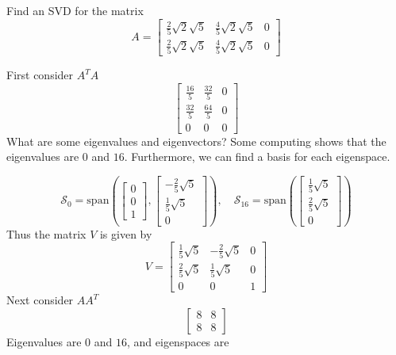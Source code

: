 \documentclass{ximera}
\begin{document}
\begin{example}\label{SVDanother2x3}
Find an SVD for the matrix
\begin{equation*}
A= \left[
\begin{array}{ccc}
\frac{2}{5}\sqrt{2}\sqrt{5} & \frac{4}{5}\sqrt{2}\sqrt{5} & 0 \\
\frac{2}{5}\sqrt{2}\sqrt{5} & \frac{4}{5}\sqrt{2}\sqrt{5} & 0
\end{array}
\right]
\end{equation*}
 
\begin{explanation}
First consider $A^TA$
\begin{equation*}
\left[
\begin{array}{ccc}
\frac{16}{5} & \frac{32}{5} & 0 \\
\frac{32}{5} & \frac{64}{5} & 0 \\
0 & 0 & 0
\end{array}
\right]
\end{equation*}
What are some eigenvalues and eigenvectors? Some computing shows that the eigenvalues are $0$ and $16$.  Furthermore, we can find a basis for each eigenspace.
 
\begin{equation*}
\mathcal{S}_0=\mbox{span}\left( \left[
\begin{array}{c}
0 \\
0 \\
1
\end{array}
\right] ,\left[ 
\begin{array}{c}
-\frac{2}{5}\sqrt{5} \\
\frac{1}{5}\sqrt{5} \\
0
\end{array}
\right] \right),
\quad\mathcal{S}_{16}=\mbox{span}\left( \left[ 
\begin{array}{c}
\frac{1}{5}\sqrt{5} \\
\frac{2}{5}\sqrt{5} \\
0
\end{array}
\right] \right)
\end{equation*}
Thus the matrix $V$ is given by
\begin{equation*}
V=\left[
\begin{array}{ccc}
\frac{1}{5}\sqrt{5} & -\frac{2}{5}\sqrt{5} & 0 \\
\frac{2}{5}\sqrt{5} & \frac{1}{5}\sqrt{5} & 0 \\
0 & 0 & 1
\end{array}
\right]
\end{equation*}
Next consider $AA^T$
\begin{equation*}
\left[
\begin{array}{cc}
8 & 8 \\
8 & 8
\end{array}
\right]
\end{equation*}
Eigenvalues are $0$ and $16$, and eigenspaces are
 

\end{explanation}
\end{example}
\end{document}
